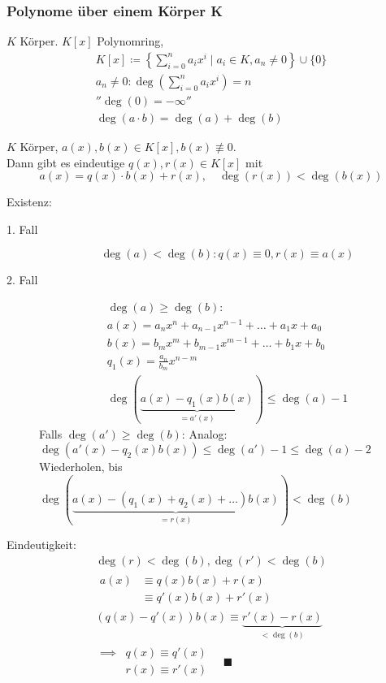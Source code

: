 \subsubsection{Polynome über einem Körper K}
\begin{def*}[note = Polynomring , index = Polynomring]
	$K$ Körper. $K[x]$ Polynomring,
	\begin{gather*}
		K[x] \coloneqq \left\{ \sum_{i=0}^n a_i x^i \mid a_i \in K , a_n \neq 0 \right\} \cup \{ 0 \} \\
		a_n \neq 0 : \deg\left( \sum_{i=0}^n a_i x^i \right) = n \\
		''\deg(0) = -\infty'' \\
		\deg(a \cdot b) = \deg(a) + \deg(b)
	\end{gather*}
\end{def*}
\begin{satz*}[note = (Euklid)]
	$K$ Körper, $a(x) , b(x) \in K[x] , b(x) \not\equiv 0$.\\
	Dann gibt es eindeutige $q(x) , r(x) \in K[x]$ mit
	\[ a(x) = q(x) \cdot b(x) + r(x) , \quad \deg(r(x)) < \deg(b(x)) \]
	\begin{bew}
		Existenz:
		\begin{description}
			\item[1. Fall] \[ \deg(a) < \deg(b) : q(x) \equiv 0 , r(x) \equiv a(x) \]
			\item[2. Fall]
				\begin{gather*}
					\deg(a) \geq \deg(b) :	\\
					a(x) = a_n x^n + a_{n-1} x^{n-1} + \dots + a_1 x + a_0 \\
					b(x) = b_m x^m + b_{m-1} x^{m-1} + \dots + b_1 x + b_0 \\
					q_1(x) = \frac{a_n}{b_m} x^{n-m} \\
					\deg(\underbrace{a(x) - q_1(x) b(x)}_{=a'(x)}) \leq \deg(a) - 1
				\end{gather*}
				Falls $\deg(a') \geq \deg(b)$: Analog: $\deg(a'(x) - q_2(x) b(x)) \leq \deg(a') - 1 \leq \deg(a) - 2$ \\
				Wiederholen, bis $\deg(\underbrace{a(x) - ( q_1(x) + q_2(x) + \dots ) b(x)}_{=r(x)}) < \deg(b)$
		\end{description}
		Eindeutigkeit:
		\begin{gather*}
			\deg(r) < \deg(b) , \deg(r') < \deg(b) \\
			\begin{split}
				a(x)	&\equiv q(x) b(x) + r(x) \\
					&\equiv q'(x) b(x) + r'(x)
			\end{split} \\
			(q(x) - q'(x)) b(x) \equiv \underbrace{r'(x) - r(x)}_{<\deg(b)} \\
			\begin{split}
				\implies	&q(x) \equiv q'(x) \\
						&r(x) \equiv r'(x)
			\end{split} \quad \blacksquare
		\end{gather*}
	\end{bew}
\end{satz*}

